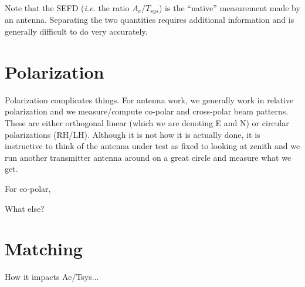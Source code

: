 \documentclass[11pt]{article}
\begin{document}
Note that the SEFD ({\em i.e.} the ratio $A_e/T_{sys}$) is the ``native'' measurement made by an antenna.  Separating the two quantities requires additional information and is generally difficult to do very accurately. 

\section{Polarization}
Polarization complicates things.  For antenna work, we generally work in relative polarization and we measure/compute co-polar and cross-polar beam patterns.  These are either orthogonal linear (which we are denoting E and N) or circular polarizations (RH/LH).
Although it is not how it is actually done, it is instructive to think of the antenna under test as fixed to looking at zenith and we run another transmitter antenna around on a great circle and measure what we get.

For co-polar, 

What else?

\section{Matching}
How it impacts Ae/Tsys...

%
%
%


\end{document}
